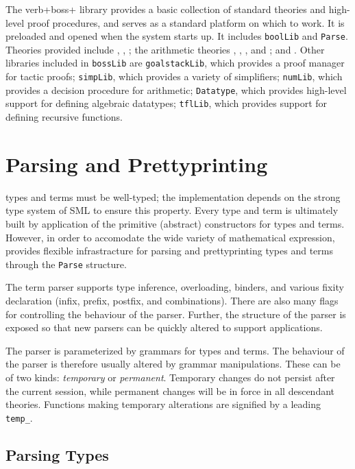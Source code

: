 {The verb+boss+ library provides a basic collection of standard
theories and high-level proof procedures, and serves as a standard
platform on which to work. It is preloaded and opened when the \HOL{}
system starts up. It includes {\small\verb+boolLib+} and
{\small\verb+Parse+}. Theories provided include ,
, ; the arithmetic theories
, , ,
and ; and . Other libraries
included in \verb+bossLib+ are \verb+goalstackLib+, which provides
a proof manager for tactic proofs; \verb+simpLib+, which provides
a variety of simplifiers; \verb+numLib+, which provides a decision
procedure for arithmetic; \verb+Datatype+, which provides
high-level support for defining algebraic datatypes; \verb+tflLib+,
which provides support for defining recursive functions.


\section{Parsing and Prettyprinting}

\HOL{} types and terms must be well-typed; the \HOL{} implementation
depends on the strong type system of SML to ensure this property.
Every type and term is ultimately built by application of the
primitive (abstract) constructors for types and terms. However, in
order to accomodate the wide variety of mathematical expression,
\HOL{} provides flexible infrastracture for parsing and prettyprinting
types and terms through the \verb+Parse+ structure.

The term parser supports type inference, overloading, binders, and
various fixity declaration (infix, prefix, postfix, and
combinations). There are also many flags for controlling the behaviour
of the parser. Further, the structure of the parser is exposed so that
new parsers can be quickly altered to support applications.

The parser is parameterized by grammars for types and terms. The
behaviour of the parser is therefore usually altered by grammar
manipulations. These can be of two kinds: \emph{temporary} or
\emph{permanent}.  Temporary changes do not persist after the current
session, while permanent changes will be in force in all descendant
theories.  Functions making temporary alterations are signified
by a leading \verb+temp_+.

\subsection{Parsing Types}

}

